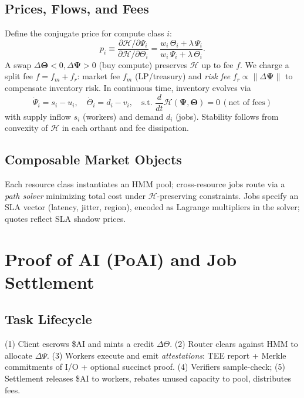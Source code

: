\documentclass[11pt]{article}
\begin{document}
\subsection{Prices, Flows, and Fees}
Define the conjugate price for compute class \(i\):
\begin{equation}
 p_i \equiv \frac{\partial \mathcal H/\partial \Psi_i}{\partial \mathcal H/\partial \Theta_i} = \frac{w_i\,\Theta_i + \lambda\,\Psi_i}{w_i\,\Psi_i + \lambda\,\Theta_i}.
\end{equation}
A swap \(\Delta\bm\Theta<0, \Delta\bm\Psi>0\) (buy compute) preserves \(\mathcal H\) up to fee \(f\). We charge a split fee \(f=f_m+f_r\): market fee \(f_m\) (LP/treasury) and \emph{risk fee} \(f_r\propto \|\Delta\bm\Psi\|\) to compensate inventory risk. In continuous time, inventory evolves via
\begin{equation}
\dot{\Psi}_i = s_i - u_i,\quad \dot{\Theta}_i = d_i - v_i,\quad \text{s.t. } \frac{d}{dt}\mathcal H(\bm\Psi,\bm\Theta)=0 \, (\text{net of fees})
\end{equation}
with supply inflow \(s_i\) (workers) and demand \(d_i\) (jobs). Stability follows from convexity of \(\mathcal H\) in each orthant and fee dissipation.

\subsection{Composable Market Objects}
Each resource class instantiates an HMM pool; cross-resource jobs route via a \emph{path solver} minimizing total cost under \(\mathcal H\)-preserving constraints. Jobs specify an SLA vector (latency, jitter, region), encoded as Lagrange multipliers in the solver; quotes reflect SLA shadow prices.

\section{Proof of AI (PoAI) and Job Settlement}
\subsection{Task Lifecycle}
(1) Client escrows \$AI and mints a credit \(\Delta\Theta\). (2) Router clears against HMM to allocate \(\Delta\Psi\). (3) Workers execute and emit \emph{attestations}: TEE report + Merkle commitments of I/O + optional succinct proof. (4) Verifiers sample-check; (5) Settlement releases \$AI to workers, rebates unused capacity to pool, distributes fees.
\end{document}
